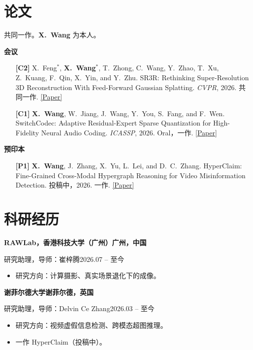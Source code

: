 \documentclass[10pt,a4paper]{article}
\newcommand{\me}[1]{\textbf{#1}}
\newcommand{\cvlink}[2]{\href{#1}{#2}}
\newcommand{\entry}[4]{%
  \par\vspace{1pt}%
  \noindent\textbf{#1}\hfill\textbf{#2}\par
  {\small #3\hfill #4}\par
}
\begin{document}
\section{论文}

{\small *共同一作。\textbf{X.\ Wang} 为本人。}

\vspace{3pt}
{\small\noindent\textbf{\color{accent}会议}}
\begin{enumerate}
  \item[\textbf{[C2]}]
        X.\ Feng$^*$, \me{X.\ Wang}$^*$, T.\ Zhong, C.\ Wang, Y.\ Zhao, T.\ Xu, Z.\ Kuang, F.\ Qin, X.\ Yin, and Y.\ Zhu.
        SR3R: Rethinking Super-Resolution 3D Reconstruction With Feed-Forward Gaussian Splatting.
        \textit{CVPR}, 2026. 共同一作.
        \cvlink{https://openaccess.thecvf.com/content/CVPR2026/papers/Feng_SR3R_Rethinking_Super-Resolution_3D_Reconstruction_With_Feed-Forward_Gaussian_Splatting_CVPR_2026_paper.pdf}{[Paper]}
  \item[\textbf{[C1]}]
        \me{X.\ Wang}, W.\ Jiang, J.\ Wang, Y.\ You, S.\ Fang, and F.\ Wen.
        SwitchCodec: Adaptive Residual-Expert Sparse Quantization for High-Fidelity Neural Audio Coding.
        \textit{ICASSP}, 2026. Oral，一作.
        \cvlink{https://arxiv.org/abs/2601.20362}{[Paper]}
\end{enumerate}

\vspace{2pt}
{\small\noindent\textbf{\color{accent}预印本}}
\begin{enumerate}
  \item[\textbf{[P1]}]
        \me{X.\ Wang}, J.\ Zhang, X.\ Yu, L.\ Lei, and D.\ C.\ Zhang.
        HyperClaim: Fine-Grained Cross-Modal Hypergraph Reasoning for Video Misinformation Detection.
        投稿中，2026. 一作.
        \cvlink{https://arxiv.org/abs/2607.28375}{[Paper]}
\end{enumerate}

\section{科研经历}

\entry{RAWLab，香港科技大学（广州）}{广州，中国}
{研究助理，导师：崔梓腾}{2026.07 -- 至今}
\begin{itemize}
  \item 研究方向：计算摄影、真实场景退化下的成像。
\end{itemize}

\vspace{3pt}
\entry{谢菲尔德大学}{谢菲尔德，英国}
{研究助理，导师：Delvin Ce Zhang}{2026.03 -- 至今}
\begin{itemize}
  \item 研究方向：视频虚假信息检测、跨模态超图推理。
  \item 一作 HyperClaim（投稿中）。
\end{itemize}
\end{document}
